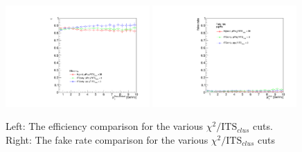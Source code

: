\begin{figure}[h]
    \centering
    \includegraphics[width=0.49\textwidth]{Appendices/ITSchi2_study_efficiency.pdf}
        \includegraphics[width=0.49\textwidth]{Appendices/ITSchi2_study_fakerate.pdf}
    \caption{Left: The efficiency comparison for the various $\chi^2/\mathrm{ITS}_{clus}$ cuts. Right: The fake rate comparison for the various $\chi^2/\mathrm{ITS}_{clus}$ cuts}
    \label{fig:chi2_eff}
\end{figure}

